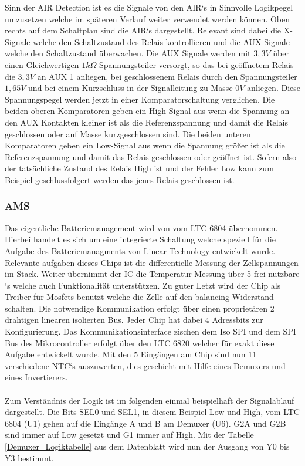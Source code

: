 Sinn der \ac{AIR} Detection ist es die Signale von den \ac{AIR}`s in Sinnvolle Logikpegel umzusetzen welche im späteren Verlauf weiter verwendet werden können. Oben rechts auf dem Schaltplan sind die \ac{AIR}`s dargestellt. Relevant sind dabei die X-Signale welche den Schaltzustand des Relais kontrollieren und die \ac{AUX} Signale welche den Schaltzustand überwachen. Die \ac{AUX} Signale werden mit \ensuremath{3,3V} über einen Gleichwertigen \ensuremath{1 k\Omega} Spannungsteiler versorgt, so das bei geöffnetem Relais die \ensuremath{3,3V} an \ac{AUX} 1 anliegen, bei geschlossenem Relais durch den Spannungsteiler \ensuremath{1,65V} und bei einem Kurzschluss in der Signalleitung zu Masse \ensuremath{0V} anliegen. Diese Spannungspegel werden jetzt in einer Komparatorschaltung verglichen. Die beiden oberen Komparatoren geben ein High-Signal aus wenn die Spannung an den \ac{AUX} Kontakten kleiner ist als die Referenzspannung und damit die Relais geschlossen oder auf Masse kurzgeschlossen sind. Die beiden unteren Komparatoren geben ein Low-Signal aus wenn die Spannung größer ist als die Referenzspannung und damit das Relais geschlossen oder geöffnet ist. Sofern also der tatsächliche Zustand des Relais High ist und der Fehler Low kann zum Beispiel geschlussfolgert werden das jenes Relais geschlossen ist.
\FloatBarrier
\subsubsection{\ac{AMS}}
Das eigentliche Batteriemanagement wird von vom LTC 6804 übernommen. Hierbei handelt es sich um eine integrierte Schaltung welche speziell für die Aufgabe des Batteriemanagments von Linear Technology entwickelt wurde. Relevante aufgaben dieses Chips ist die differentielle Messung der Zellspannungen im Stack. Weiter übernimmt der IC die Temperatur Messung über 5 frei nutzbare `s welche auch  Funktionalität unterstützen. Zu guter Letzt wird der Chip als Treiber für Mosfets benutzt welche die Zelle auf den balancing Widerstand schalten. Die notwendige Kommunikation erfolgt über einen proprietären 2 drahtigen linearen isolierten  Bus. Jeder Chip hat dabei 4 Adressbits zur Konfigurierung. Das Kommunikationsinterface zischen dem Iso \ac{SPI} und dem \ac{SPI} Bus des Mikrocontroller erfolgt über den LTC 6820 welcher für exakt diese Aufgabe entwickelt wurde. Mit den 5 Eingängen am Chip sind nun 11 verschiedene NTC`s auszuwerten, dies geschieht mit Hilfe eines Demuxers und eines Invertierers.
\\
\\
Zum Verständnis der Logik ist im folgenden einmal beispielhaft der Signalablauf dargestellt.
Die Bits SEL0 und SEL1, in diesem Beispiel Low und High, vom LTC 6804 (U1) gehen auf die Eingänge A und B am Demuxer (U6). G2A und G2B sind immer auf Low gesetzt und G1 immer auf High. Mit der Tabelle \ref{Demuxer_Logiktabelle} aus dem Datenblatt wird nun der Ausgang von Y0 bis Y3 bestimmt.

